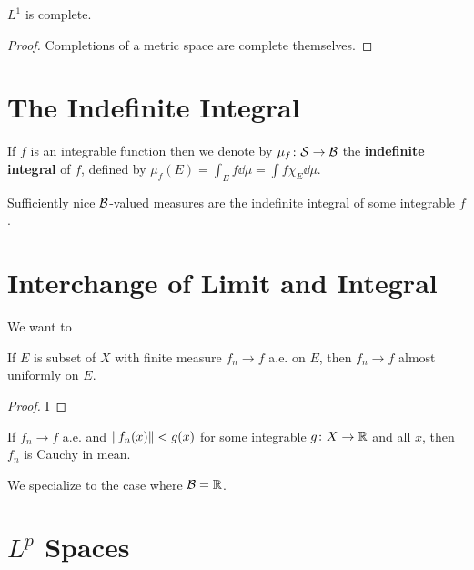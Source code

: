 \begin{corollary}
    $L^1$ is complete.
\end{corollary}

\begin{proof}
    Completions of a metric space are complete themselves.
\end{proof}

\section{The Indefinite Integral}

\begin{definition}
    If $f$ is an integrable function then we denote by $\mu_f \colon \mathcal S \to \mathcal B$ the \textbf{indefinite integral} of $f$, defined by $\mu_f(E) = \int_E f \dd{\mu} = \int f\chi_E  \dd{\mu}$.
\end{definition}

\begin{theorem}
    Sufficiently nice $\mathcal B$-valued measures are the indefinite integral of some integrable $f$.
\end{theorem}

\section{Interchange of Limit and Integral}

We want to 

\begin{theorem}
    If $E$ is subset of $X$ with finite measure $f_n \to f$ a.e. on $E$, then $f_n \to f$ almost uniformly on $E$.
\end{theorem}

\begin{proof}
    I
\end{proof}

\begin{theorem}
    If $f_n \to f$ a.e. and $\norm{f_n(x)} < g(x)$ for some integrable $g \colon X \to \mathbb R$ and all $x$, then $f_n$ is Cauchy in mean.
\end{theorem}

We specialize to the case where $\mathcal B = \mathbb R$.

\begin{theorem}
    
\end{theorem}

\section{$L^p$ Spaces}

